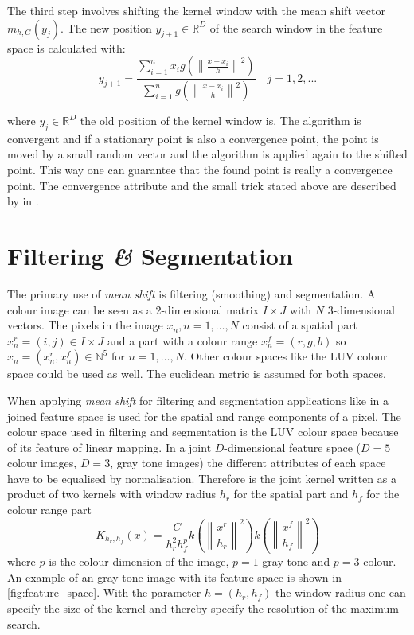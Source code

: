The third step involves shifting the kernel window with the mean shift
vector $m_{h,G}(y_j)$. The new position $y_{j+1} \in \mathbb{R}^D$ of
the search window in the feature space is calculated with:
\begin{equation}\label{eq:msproc}
  y_{j+1} = 
  \frac{\sum_{i=1}^n x_i g\left(\left\lVert \frac{x - x_i}{h}
      \right\rVert^2\right)}{\sum_{i=1}^n g\left(\left\lVert \frac{x - x_i}{h}
      \right\rVert^2\right)} \quad j = 1,2,...
\end{equation}


where $y_j \in \mathbb{R}^D$ the old position of the kernel window
is. The algorithm is convergent and if a stationary point is also a
convergence point, the point is moved by a small random vector and the
algorithm is applied again to the shifted point. This way one can
guarantee that the found point is really a convergence point. The
convergence attribute and the small trick stated above are described
by \citeauthor{citeulike:462300} in \citep{citeulike:462300}.


\section{Filtering {\itshape\&} Segmentation} %
\label{sec:filtering_segmentation}
The primary use of \emph{mean shift} is filtering (smoothing) and
segmentation.  A colour image can be seen as a 2-dimensional matrix $I
\times J$ with $N$ 3-dimensional vectors. The pixels in the image
$x_n, n = 1, \ldots , N$ consist of a spatial part $x_n^r = (i,j) \in
I \times J$ and a part with a colour range $x_n^f = (r,g,b)$ so $x_n =
(x_n^r, x_n^f) \in \mathbb{N}^5$ for $n = 1, \ldots , N$.  Other colour
spaces like the \gls{LUV} colour space could be used as well. The
euclidean metric is assumed for both spaces.

When applying \emph{mean shift} for filtering and segmentation
applications like in \citeauthor{citeulike:462300}
\citep{citeulike:462300} a joined feature space is used for the
spatial and range components of a pixel. The colour space used in
filtering and segmentation is the \gls{LUV} colour space because of its
feature of linear mapping. In a joint $D$-dimensional feature space
($D=5$ colour images, $D=3$, gray tone images) the different attributes
of each space have to be equalised by normalisation. Therefore is the
joint kernel written as a product of two kernels with window radius
$h_r$ for the spatial part and $h_f$ for the colour range part
\begin{equation}\label{eq:jokernel}
  K_{h_r, h_f}(x) = \frac{C}{h_r^2h_f^p}
  k \left( \left\lVert \frac{x^r}{h_r} \right\rVert^2\right) 
  k \left( \left\lVert \frac{x^f}{h_f} \right\rVert^2\right) 
\end{equation}
where $p$ is the colour dimension of the image, $p=1$ gray tone and
$p=3$ colour.  An example of an gray tone image with its feature space
is shown in \autoref{fig:feature_space}. With the parameter $h = (h_r,
h_f)$ the window radius one can specify the size of the kernel and
thereby specify the resolution of the maximum search.

